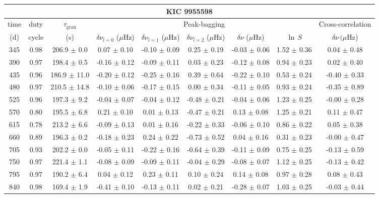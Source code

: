 \documentclass[twocolumn]{aastex61}%
\begin{document}
\begin{table*}[ht]\centering\fontsize{9.}{7.}\selectfont
\begin{tabular}{ccc|ccccc|c}
\multicolumn{9}{c}{KIC 9955598}\\ \hline\hline
time & duty & $\tau_\text{gran}$ &\multicolumn{5}{c|}{Peak-bagging}&Cross-correlation\\
(d)& cycle & (s)&$\delta\nu_{l=0}$ ($\mu$Hz) & $\delta\nu_{l=1}$ ($\mu$Hz) & $\delta\nu_{l=2}$ ($\mu$Hz) & $\delta\nu$ ($\mu$Hz)& $\ln\,S$ & $\delta\nu\,(\mu$Hz)\\\hline
345 & 0.98 & 206.9 $\pm$ 0.0 & 0.07 $\pm$ 0.10 & -0.10 $\pm$ 0.09 & 0.25 $\pm$ 0.19 & -0.03 $\pm$ 0.06 & 1.52 $\pm$ 0.36 & 0.04 $\pm$ 0.48\\
390 & 0.97 & 198.4 $\pm$ 0.5 & -0.16 $\pm$ 0.12 & -0.09 $\pm$ 0.11 & 0.03 $\pm$ 0.23 & -0.12 $\pm$ 0.08 & 0.94 $\pm$ 0.23 & 0.02 $\pm$ 0.40\\
435 & 0.96 & 186.9 $\pm$ 11.0 & -0.20 $\pm$ 0.12 & -0.25 $\pm$ 0.16 & 0.39 $\pm$ 0.64 & -0.22 $\pm$ 0.10 & 0.53 $\pm$ 0.24 & -0.40 $\pm$ 0.33\\
480 & 0.97 & 210.5 $\pm$ 14.8 & -0.10 $\pm$ 0.06 & -0.17 $\pm$ 0.15 & 0.00 $\pm$ 0.34 & -0.11 $\pm$ 0.05 & 0.93 $\pm$ 0.24 & -0.35 $\pm$ 0.89\\
525 & 0.96 & 197.3 $\pm$ 9.2 & -0.04 $\pm$ 0.07 & -0.04 $\pm$ 0.12 & -0.48 $\pm$ 0.21 & -0.04 $\pm$ 0.06 & 1.23 $\pm$ 0.25 & -0.00 $\pm$ 0.28\\
570 & 0.80 & 195.5 $\pm$ 6.8 & 0.21 $\pm$ 0.10 & 0.01 $\pm$ 0.13 & -0.47 $\pm$ 0.21 & 0.13 $\pm$ 0.08 & 1.25 $\pm$ 0.21 & 0.11 $\pm$ 0.47\\
615 & 0.78 & 213.2 $\pm$ 6.6 & -0.09 $\pm$ 0.13 & 0.01 $\pm$ 0.16 & -0.22 $\pm$ 0.33 & -0.06 $\pm$ 0.10 & 0.86 $\pm$ 0.22 & 0.05 $\pm$ 0.38\\
660 & 0.89 & 196.3 $\pm$ 0.2 & -0.18 $\pm$ 0.23 & 0.24 $\pm$ 0.22 & -0.73 $\pm$ 0.52 & 0.04 $\pm$ 0.16 & 0.31 $\pm$ 0.23 & -0.00 $\pm$ 0.47\\
705 & 0.93 & 202.2 $\pm$ 0.0 & -0.05 $\pm$ 0.11 & -0.22 $\pm$ 0.16 & -0.64 $\pm$ 0.39 & -0.11 $\pm$ 0.09 & 0.75 $\pm$ 0.25 & -0.13 $\pm$ 0.59\\
750 & 0.97 & 221.4 $\pm$ 1.1 & -0.08 $\pm$ 0.09 & -0.09 $\pm$ 0.11 & -0.04 $\pm$ 0.29 & -0.08 $\pm$ 0.07 & 1.12 $\pm$ 0.25 & -0.13 $\pm$ 0.42\\
795 & 0.97 & 190.2 $\pm$ 6.4 & 0.04 $\pm$ 0.12 & 0.23 $\pm$ 0.11 & 0.10 $\pm$ 0.24 & 0.14 $\pm$ 0.08 & 0.97 $\pm$ 0.28 & 0.08 $\pm$ 0.43\\
840 & 0.98 & 169.4 $\pm$ 1.9 & -0.41 $\pm$ 0.10 & -0.13 $\pm$ 0.11 & 0.02 $\pm$ 0.21 & -0.28 $\pm$ 0.07 & 1.03 $\pm$ 0.25 & -0.03 $\pm$ 0.44\\

\end{tabular}
\end{table*}
\end{document}
